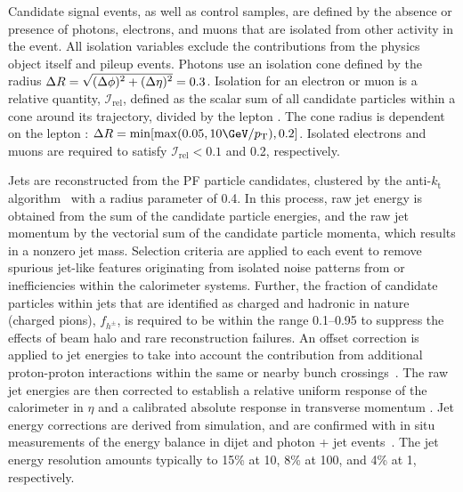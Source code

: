 Candidate signal events, as well as control samples, are defined by
the absence or presence of photons, electrons, and muons that are
isolated from other activity in the event. All isolation variables
exclude the contributions from the physics object itself and pileup
events. Photons use an isolation cone defined by the radius $\Delta R
= \sqrt{\smash[b]{(\Delta\phi)^2 + (\Delta\eta)^2}} = 0.3$.
Isolation for an electron or muon is a relative quantity,
$\mathcal{I}_\textrm{rel}$, defined as the scalar \Pt sum of all
candidate particles within a cone around its trajectory, divided by
the lepton \Pt. The cone radius is dependent on the lepton \Pt:
$\Delta R = \min [ \max( 0.05, 10\GeV / \Pt ), 0.2 ]$. Isolated
electrons and muons are required to satisfy $\mathcal{I}_\text{rel} <
0.1$ and 0.2, respectively.

Jets are reconstructed from the PF particle candidates, clustered by
the anti-$k_\mathrm{t}$ algorithm~\cite{Cacciari:2008gp,
  Cacciari:2011ma} with a radius parameter of 0.4. In this process,
raw jet energy is obtained from the sum of the candidate particle
energies, and the raw jet momentum by the vectorial sum of the
candidate particle momenta, which results in a nonzero jet
mass. Selection criteria are applied to each event to remove spurious
jet-like features originating from isolated noise patterns from or
inefficiencies within the calorimeter systems. Further, the fraction
of candidate particles within jets that are identified as charged and
hadronic in nature (\eg charged pions), $f_{h^{\pm}}$, is required to
be within the range 0.1--0.95 to suppress the effects of beam halo and
rare reconstruction failures. An offset correction is applied to jet
energies to take into account the contribution from additional
proton-proton interactions within the same or nearby bunch
crossings~\cite{pileup}.  The raw jet energies are then corrected to
establish a relative uniform response of the calorimeter in $\eta$ and
a calibrated absolute response in transverse momentum \pt. Jet energy
corrections are derived from simulation, and are confirmed with in
situ measurements of the energy balance in dijet and photon + jet
events~\cite{Chatrchyan:2011ds}. The jet energy resolution amounts
typically to 15\% at 10\GeV, 8\% at 100\GeV, and 4\% at 1\TeV,
respectively.

